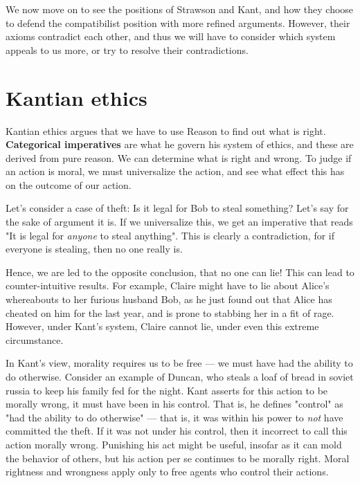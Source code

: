 \documentclass{article}
\begin{document}
We now move on to see the positions of Strawson and Kant, and how they choose
to defend the compatibilist position with more refined arguments. However,
their axioms contradict each other, and thus we will have to consider
which system appeals to us more, or try to resolve their contradictions.

\section{Kantian ethics}

Kantian ethics argues that we have to use Reason to find out what is right.
\textbf{Categorical imperatives} are what he govern his system of ethics, and
these are derived from pure reason. We can determine what is right and wrong.
To judge if an action is moral, we must universalize the action, and see what
effect this has on the outcome of our action. 

Let's consider a case of theft: Is it legal for Bob to steal something? Let's
say for the sake of argument it is. If we universalize this, we get an
imperative that reads "It is legal for \emph{anyone} to steal anything". This
is clearly a contradiction, for if everyone is stealing, then no one really is. 

Hence, we are led to the opposite conclusion, that no one can lie!
This can lead to counter-intuitive results. For example, Claire might have to lie
about Alice's whereabouts to her furious husband Bob, as he just found out
that Alice has cheated on him for the last year, and is prone to stabbing her
in a fit of rage. However, under Kant's system, Claire cannot lie, under
even this extreme circumstance.

In Kant’s view, morality requires us to be free --- we must have had the
ability to do otherwise. Consider an example of Duncan, who steals a loaf
of bread in soviet russia to keep his family fed for the night.
Kant asserts for this action to be morally wrong, it must have been in his control.
That is, he defines "control" as "had the ability to do otherwise" --- that is,
it was within his power to \emph{not} have committed the theft. If it was
not under his control, then it incorrect to call this action morally wrong.
Punishing his act might be useful, insofar as it can mold the behavior of others,
but his action per se continues to be morally right.  Moral rightness and
wrongness apply only to free agents who control their actions.

\end{document}
